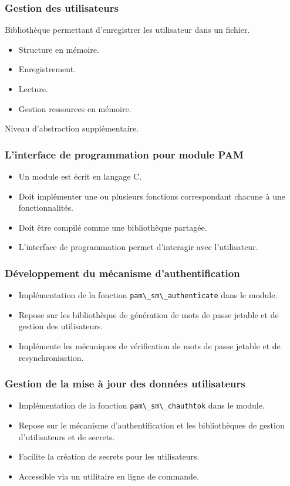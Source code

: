 \documentclass[xcolor=table]{beamer}
\begin{document}
\begin{frame}  
\frametitle{Gestion des utilisateurs}
Bibliothèque permettant d'enregistrer les utilisateur dans un fichier.
\begin{itemize}
  \item Structure en mémoire.
  \item Enregistrement.
  \item Lecture.
  \item Gestion ressources en mémoire.
\end{itemize}

Niveau d'abstraction supplémentaire.
\end{frame}

\begin{frame}
\frametitle{L'interface de programmation pour module PAM}
\begin{itemize}
  \item Un module est écrit en langage C.
  \item Doit implémenter une ou plusieurs fonctions correspondant chacune à une fonctionnalités.
  \item Doit être compilé comme une bibliothèque partagée.
  \item L'interface de programmation permet d'interagir avec l'utilisateur.
\end{itemize}

\end{frame}

\begin{frame}
\frametitle{Développement du mécanisme d'authentification}
\begin{itemize}
\item Implémentation de la fonction \verb?pam\_sm\_authenticate? dans le module.
\item Repose sur les bibliothèque de génération de mots de passe jetable et de gestion
des utilisateurs.
\item Implémente les mécaniques de vérification de mots de passe jetable et de resynchronisation.
\end{itemize}
\end{frame}

\begin{frame}
\frametitle{Gestion de la mise à jour des données utilisateurs}
\begin{itemize}
  \item Implémentation de la fonction \verb?pam\_sm\_chauthtok? dans le module.
  \item Repose sur le mécanisme d'authentification et les bibliothèques de gestion
  d'utilisateurs et de secrets.
  \item Facilite la création de secrets pour les utilisateurs.
  \item Accessible via un utilitaire en ligne de commande.
\end{itemize}

\end{frame}
\end{document}
